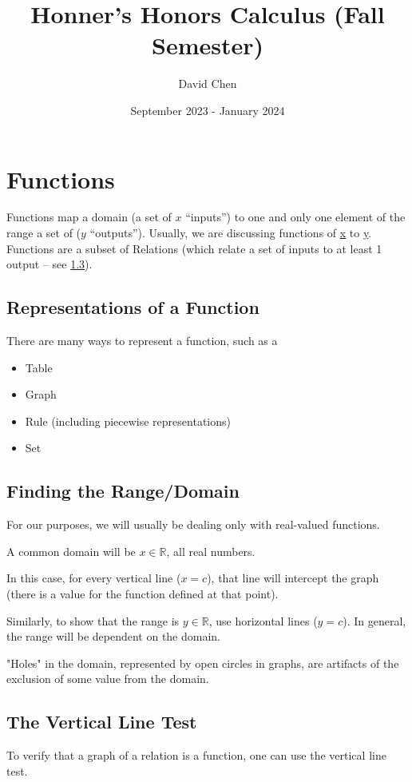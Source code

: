 \documentclass{article}
\title{Honner's Honors Calculus (Fall Semester)}
\author{David Chen}
\date{September 2023 - January 2024}
\begin{document}
\maketitle

\section{Functions}
Functions map a domain (a set of $x$ ``inputs'') to one and only one element of the range a set of ($y$ ``outputs''). Usually, we are discussing functions of \underline{x} to \underline{y}.
Functions are a subset of Relations (which relate a set of inputs to at least 1 output -- see \ref{vertical-line}).

\subsection{Representations of a Function}
There are many ways to represent a function, such as a
\begin{itemize}
    \item Table
    \item Graph
    \item Rule (including piecewise representations)
    \item Set
\end{itemize}

\subsection{Finding the Range/Domain}
For our purposes, we will usually be dealing only with real-valued functions.

A common domain will be $x \in \mathbb{R}$, all real numbers.

In this case, for every vertical line ($x=c$), that line will intercept the graph (there is a value for the function defined at that point).

Similarly, to show that the range is $y \in \mathbb{R}$, use horizontal lines ($y=c$). In general, the range will be dependent on the domain.

"Holes" in the domain, represented by open circles in graphs, are artifacts of the exclusion of some value from the domain.

\subsection{The Vertical Line Test} \label{vertical-line}
To verify that a graph of a relation is a function, one can use the vertical line test.
\end{document}
